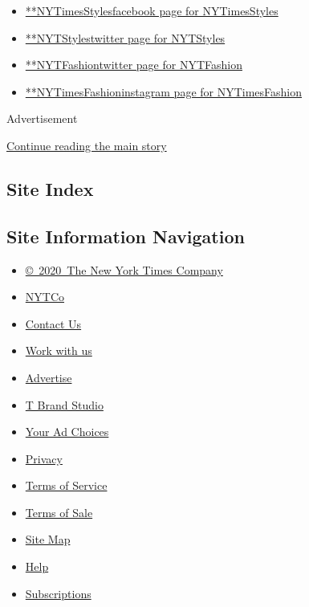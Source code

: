 \begin{itemize}
\tightlist
\item
  \href{https://www.facebook.com/NYTimesStyles}{**NYTimesStylesfacebook
  page for NYTimesStyles}
\item
  \href{https://twitter.com/NYTStyles}{**NYTStylestwitter page for
  NYTStyles}
\item
  \href{https://twitter.com/NYTFashion}{**NYTFashiontwitter page for
  NYTFashion}
\item
  \href{https://instagram.com/NYTimesFashion}{**NYTimesFashioninstagram
  page for NYTimesFashion}
\end{itemize}

Advertisement

\protect\hyperlink{after-mktg}{Continue reading the main story}

\hypertarget{site-index}{%
\subsection{Site Index}\label{site-index}}

\hypertarget{site-information-navigation}{%
\subsection{Site Information
Navigation}\label{site-information-navigation}}

\begin{itemize}
\tightlist
\item
  \href{https://help.nytimes.com/hc/en-us/articles/115014792127-Copyright-notice}{©~2020~The
  New York Times Company}
\end{itemize}

\begin{itemize}
\tightlist
\item
  \href{https://www.nytco.com/}{NYTCo}
\item
  \href{https://help.nytimes.com/hc/en-us/articles/115015385887-Contact-Us}{Contact
  Us}
\item
  \href{https://www.nytco.com/careers/}{Work with us}
\item
  \href{https://nytmediakit.com/}{Advertise}
\item
  \href{http://www.tbrandstudio.com/}{T Brand Studio}
\item
  \href{https://www.nytimes.com/privacy/cookie-policy\#how-do-i-manage-trackers}{Your
  Ad Choices}
\item
  \href{https://www.nytimes.com/privacy}{Privacy}
\item
  \href{https://help.nytimes.com/hc/en-us/articles/115014893428-Terms-of-service}{Terms
  of Service}
\item
  \href{https://help.nytimes.com/hc/en-us/articles/115014893968-Terms-of-sale}{Terms
  of Sale}
\item
  \href{https://spiderbites.nytimes.com}{Site Map}
\item
  \href{https://help.nytimes.com/hc/en-us}{Help}
\item
  \href{https://www.nytimes.com/subscription?campaignId=37WXW}{Subscriptions}
\end{itemize}
